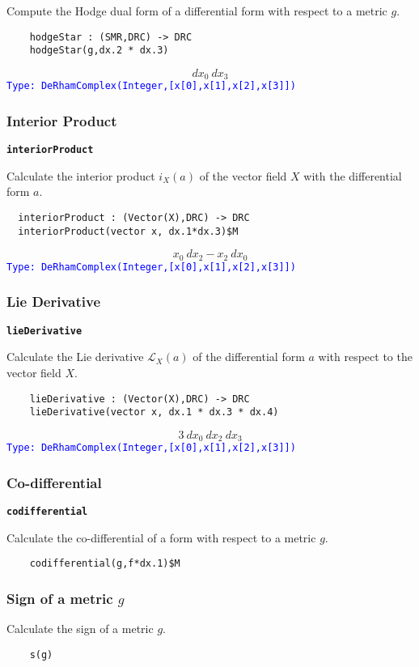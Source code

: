 \documentclass[12pt,a4paper]{article}
\newcommand{\spadbold}[1]{{\tt\bf #1}}
\newcommand{\type}[1]{\textcolor{blue}{\tt\tiny #1}}
\begin{document}
Compute the Hodge dual form of a differential form with respect
to a metric $g$.
\begin{lstlisting}    
    hodgeStar : (SMR,DRC) -> DRC     
    hodgeStar(g,dx.2 * dx.3)    
\end{lstlisting} 
\begin{displaymath}
	{dx _ {0}} \  {dx _ {3}}
\end{displaymath}
\type{Type: DeRhamComplex(Integer,[x[0],x[1],x[2],x[3]])}
%
\subsubsection{Interior Product} 
\spadbold{interiorProduct}
  
Calculate the interior product $i_X(a)$ of the vector field $X$
with the differential form $a$.
\begin{lstlisting}
  interiorProduct : (Vector(X),DRC) -> DRC 
  interiorProduct(vector x, dx.1*dx.3)$M
\end{lstlisting}
\begin{displaymath}
	 {{x _ {0}} \  {dx _ {2}}} -{{x _ {2}} \  {dx _ {0}}}
\end{displaymath}
\type{Type: DeRhamComplex(Integer,[x[0],x[1],x[2],x[3]])}  
%
\subsubsection{Lie Derivative}
\spadbold{lieDerivative}
 
Calculate the Lie derivative $\mathcal{L}_X(a)$ of the differential 
form $a$ with respect to the vector field $X$.
\begin{lstlisting}    
    lieDerivative : (Vector(X),DRC) -> DRC   
    lieDerivative(vector x, dx.1 * dx.3 * dx.4)
\end{lstlisting}    
\begin{displaymath}
	3 \  {dx _ {0}} \  {dx _ {2}} \  {dx _ {3}}
\end{displaymath}
\type{Type: DeRhamComplex(Integer,[x[0],x[1],x[2],x[3]])}
%
\subsubsection{Co-differential}
\spadbold{codifferential}

Calculate the co-differential of a form with respect to a metric $g$.
\begin{lstlisting}
    codifferential(g,f*dx.1)$M 
\end{lstlisting}
%
\subsubsection{Sign of a metric $g$}
Calculate the  sign of a metric $g$.
\begin{lstlisting}
    s(g)
\end{lstlisting}
%
\end{document}
